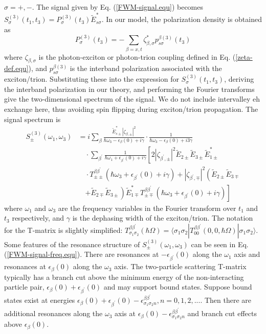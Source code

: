 \documentclass[aps,prb,superscriptaddress,letterpaper,amsmath,amssymb,twocolumn,preprintnumbers]{revtex4}
\begin{document}
{$\sigma = +,-$.
The signal given by Eq. (\ref{FWM-signal.equ}) becomes $S_{\sigma}^{(3)} (t_1, t_3) = P^{(3)}_{\sigma} (t_3) \tilde{E}^{\ast}_{s \sigma}$. In our model, the polarization density is obtained as
\begin{equation}
P^{(3)}_{\sigma} (t_3) = - \sum_{\beta = x,t} \zeta^{\ast}_{\beta , \sigma} p^{\beta (3)}_{s \sigma} (t_3)
\end{equation}
where $\zeta_{\beta , \sigma}$ is the photon-exciton or photon-trion coupling defined in Eq. (\ref{zeta-def.equ}), and $p^{\beta (3)}_{s \sigma}$ is the interband polarization associated with the exciton/trion. Substituting these into the expression for $S_{\sigma}^{(3)} (t_1, t_3)$, deriving the interband polarization in our theory, and performing the Fourier transforms give the two-dimensional spectrum of the signal. We do not include intervalley eh exchange here, thus avoiding spin flipping during exciton/trion propagation. The signal spectrum is
\begin{align}
S_{\pm}^{(3)} (\omega_1 , \omega_3) &= i \sum_{\beta} \frac {\tilde{E}^{\ast}_{s \pm} |\zeta_{\beta , \pm}|^2} {\hbar \omega_3 - \epsilon_{\beta} (0) + i \gamma} \cdot
\frac {1} {\hbar \omega_3 - \epsilon_{\beta} (0) + i 3 \gamma} \nonumber \\
& \quad \cdot \sum_{\beta^{\prime}} \frac {1} {\hbar \omega_1 + \epsilon_{\beta^{\prime}} (0) + i \gamma}
\left[ 2 |\zeta_{\beta^{\prime} , \pm}|^2 \tilde{E}_{2 \pm} \tilde{E}_{3 \pm} \tilde{E}^{\ast}_{1 \pm} \right. \nonumber \\
& \quad \cdot T^{\beta \beta^{\prime}}_{\pm \pm} (\hbar \omega_3 + \epsilon_{\beta^{\prime}} (0) + i \gamma) + |\zeta_{\beta^{\prime} , \mp}|^2 \left( \tilde{E}_{2 \pm} \tilde{E}_{3 \mp} \right. \nonumber \\
& \quad \left. \left. + \tilde{E}_{2 \mp} \tilde{E}_{3 \pm} \right) \tilde{E}^{\ast}_{1 \mp} T^{\beta \beta^{\prime}}_{\pm \mp} (\hbar \omega_3 + \epsilon_{\beta^{\prime}} (0) + i \gamma) \right] \label{FWM-signal-freq.equ}
\end{align}
where $\omega_1$ and $\omega_3$ are the frequency variables in the Fourier transform over $t_1$ and $t_3$ respectively, and $\gamma$ is the dephasing width of the exciton/trion. The notation for the T-matrix is slightly simplified: $T^{\beta \beta^{\prime}}_{\sigma_1 \sigma_2} ( \hbar \Omega )= \langle \sigma_1 \sigma_2 | T^{\beta \beta^{\prime}}_{0 0} (0 , 0, \hbar \Omega) | \sigma_1 \sigma_2 \rangle$. Some features of the resonance structure of $S_{\pm}^{(3)} (\omega_1 , \omega_3)$ can be seen in Eq. (\ref{FWM-signal-freq.equ}). There are resonances at $- \epsilon_{\beta^{\prime}} (0)$ along the $\omega_1$ axis and resonances at $\epsilon_{\beta} (0)$ along the $\omega_3$ axis. The two-particle scattering T-matrix typically has a branch cut above the minimum energy of the non-interacting particle pair, $\epsilon_{\beta} (0) + \epsilon_{\beta^{\prime}} (0)$ and may support bound states. Suppose bound states exist at energies $\epsilon_{\beta} (0) + \epsilon_{\beta^{\prime}} (0) - \epsilon^{\beta \beta^{\prime}}_{\sigma_1 \sigma_2 n} , n = 0, 1, 2, ...$. Then there are additional resonances along the $\omega_3$ axis at $\epsilon_{\beta} (0) - \epsilon^{\beta \beta^{\prime}}_{\sigma_1 \sigma_2 n}$ and branch cut effects above $\epsilon_{\beta} (0)$.
}
\end{document}
